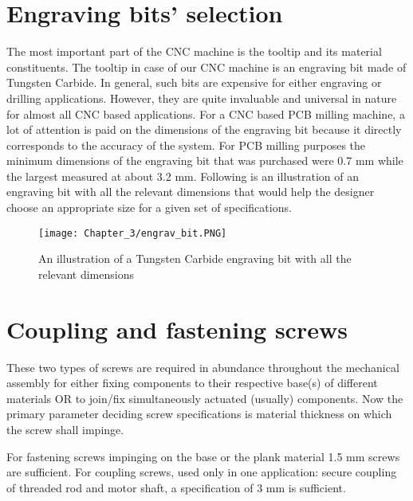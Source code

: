 \section{Engraving bits' selection}

The most important part of the CNC machine is the tooltip and its material constituents. The tooltip in case of our CNC machine is an engraving bit made of Tungsten Carbide. In general, such bits are expensive for either engraving or drilling applications. However, they are quite invaluable and universal in nature for almost all CNC based applications. For a CNC based PCB milling machine, a lot of attention is paid on the dimensions of the engraving bit because it directly corresponds to the accuracy of the system. For PCB milling purposes the minimum dimensions of the engraving bit that was purchased were 0.7 mm while the largest measured at about 3.2 mm. Following is an illustration of an engraving bit with all the relevant dimensions that would help the designer choose an appropriate size for a given set of specifications. 

\begin{figure}[h]
    \centering
    \texttt{[image: Chapter\_3/engrav\_bit.PNG]}
    \caption{An illustration of a Tungsten Carbide engraving bit with all the relevant dimensions}
    \label{fig:ebit}
\end{figure}

\section{Coupling and fastening screws} \label{screws}
These two types of screws are required in abundance throughout the mechanical assembly for either fixing components to their respective base(s) of different materials OR to join/fix simultaneously actuated (usually) components. Now the primary parameter deciding screw specifications is material thickness on which the screw shall impinge. \par

For fastening screws impinging on the base or the plank material 1.5 mm screws are sufficient. For coupling screws, used only in one application: secure coupling of threaded rod and motor shaft, a specification of 3 mm is sufficient.

